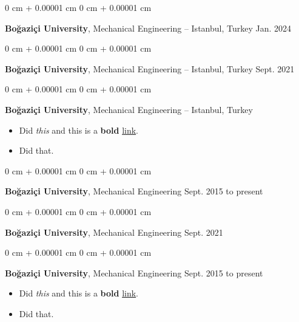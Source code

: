 \documentclass[10pt, letterpaper]{article}
\newenvironment{highlights}{
    \begin{itemize}[
        topsep=0.10 cm,
        parsep=0.10 cm,
        partopsep=0pt,
        itemsep=0pt,
        leftmargin=0 cm + 10pt
    ]
}{
    \end{itemize}
        
    \vspace{-0.20cm}
} %
\newenvironment{onecolentry}{
    \begin{adjustwidth}{
        0 cm + 0.00001 cm
    }{
        0 cm + 0.00001 cm
    }
}{
    \end{adjustwidth}
} %
\begin{document}
        \begin{onecolentry}
            \textbf{Boğaziçi University}, Mechanical Engineering -- Istanbul, Turkey \hfill Jan. 2024
        \end{onecolentry}

        \vspace{0.1 cm}

        \begin{onecolentry}
            \textbf{Boğaziçi University}, Mechanical Engineering -- Istanbul, Turkey \hfill Sept. 2021
        \end{onecolentry}

        \vspace{0.1 cm}

        \begin{onecolentry}
            \textbf{Boğaziçi University}, Mechanical Engineering -- Istanbul, Turkey \hfill 
            \begin{highlights}
                \item Did \textit{this} and this is a \textbf{bold} \href{https://example.com}{link}.
                \item Did that.
            \end{highlights}
        \end{onecolentry}

        \vspace{0.1 cm}

        \begin{onecolentry}
            \textbf{Boğaziçi University}, Mechanical Engineering \hfill Sept. 2015 to present
        \end{onecolentry}

        \vspace{0.1 cm}

        \begin{onecolentry}
            \textbf{Boğaziçi University}, Mechanical Engineering \hfill Sept. 2021
        \end{onecolentry}

        \vspace{0.1 cm}

        \begin{onecolentry}
            \textbf{Boğaziçi University}, Mechanical Engineering \hfill Sept. 2015 to present
            \begin{highlights}
                \item Did \textit{this} and this is a \textbf{bold} \href{https://example.com}{link}.
                \item Did that.
            \end{highlights}
        \end{onecolentry}
\end{document}
